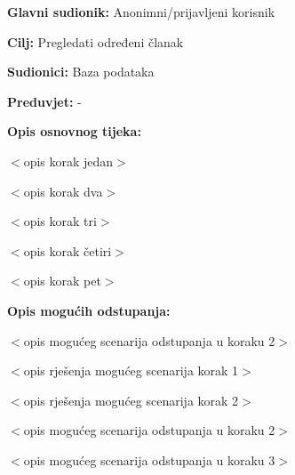 \noindent {}
\begin{packed_item}

\item \textbf{Glavni sudionik:} Anonimni/prijavljeni korisnik
\item  \textbf{Cilj:} Pregledati određeni članak
\item  \textbf{Sudionici:} Baza podataka
\item  \textbf{Preduvjet:} -
\item  \textbf{Opis osnovnog tijeka:}

\item[] \begin{packed_enum}

    \item $<$opis korak jedan$>$
    \item $<$opis korak dva$>$
    \item $<$opis korak tri$>$
    \item $<$opis korak četiri$>$
    \item $<$opis korak pet$>$

\end{packed_enum}

\item  \textbf{Opis mogućih odstupanja:}

\item[] \begin{packed_item}

    \item[2.a] $<$opis mogućeg scenarija odstupanja u koraku 2$>$

    \item[] \begin{packed_enum}

        \item $<$opis rješenja mogućeg scenarija korak 1$>$
        \item $<$opis rješenja mogućeg scenarija korak 2$>$

    \end{packed_enum}

\item[2.b] $<$opis mogućeg scenarija odstupanja u koraku 2$>$
\item[3.a] $<$opis mogućeg scenarija odstupanja  u koraku 3$>$

\end{packed_item}

\end{packed_item}

